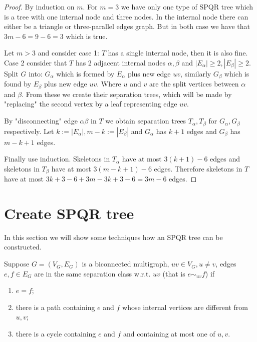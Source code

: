 \begin{proof}
	By induction on $m$. For $m = 3$ we have only one type of SPQR tree which is a tree with one internal node and three nodes. In the internal node there can either be a triangle or three-parallel edges graph. But in both case we have that $3m - 6 = 9 - 6 = 3$ which is true.
	
	Let $m > 3$ and consider case 1: $T$ has a single internal node, then it is also fine. Case 2 consider that $T$ has 2 adjacent internal nodes $\alpha, \beta$ and $|E_\alpha| \geq 2, |E_\beta| \geq 2$. Split $G$ into: $G_\alpha$ which is formed by $E_\alpha$ plus new edge $uv$, similarly $G_\beta$ which is found by $E_\beta$ plus new edge $uv$. Where $u$ and $v$ are the split vertices between $\alpha$ and $\beta$. From these we create their separation trees, which will be made by "replacing" the second vertex by a leaf representing edge $uv$.
	
	By "disconnecting" edge $\alpha\beta$ in $T$ we obtain separation trees $T_\alpha, T_\beta$ for $G_\alpha, G_\beta$ respectively. Let $k := |E_\alpha|, m -k := |E_\beta|$ and $G_\alpha$ has $k+1$ edges and $G_\beta$ has $m-k+1$ edges.
	
	Finally use induction. Skeletons in $T_\alpha$ have at most $3(k+1)-6$ edges and skeletons in $T_\beta$ have at most $3(m-k+1)-6$ edges. Therefore skeletons in $T$ have at most $3k + 3 - 6 + 3m - 3k + 3 - 6 = 3m -6$ edges.
\end{proof}

\section{Create SPQR tree}

In this section we will show some techniques how an SPQR tree can be constructed.

\begin{defn}
	Suppose $G = (V_G, E_G)$ is a biconnected multigraph, $uv \in V_G, u \neq v$, edges $e,f \in E_G$ are in the same separation class w.r.t. $uv$ (that is $e \sim_{uv} f$) if
	
	\begin{enumerate}
		\item $e = f$;
		\item there is a path containing $e$ and $f$ whose internal vertices are different from $u,v$;
		\item there is a cycle containing $e$ and $f$ and containing at most one of $u,v$.
	\end{enumerate}
\end{defn}

